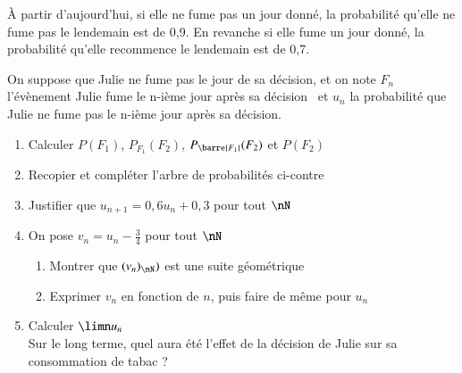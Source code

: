 \documentclass[oneside,12pt]{article}          %
\begin{document}
À partir d'aujourd'hui, si elle ne fume pas un jour donné, la probabilité qu'elle ne fume pas le lendemain est de 0,9. En revanche si elle fume un jour donné, la probabilité qu'elle recommence le lendemain est de 0,7.

On suppose que Julie ne fume pas le jour de sa décision, et on note $F_n$ l'évènement \og Julie fume le n-ième jour après sa décision \fg ~et $u_n$ la probabilité que Julie ne fume pas le n-ième jour après sa décision.


\begin{minipage}{0.6\textwidth}
\begin{enumerate}
    \item Calculer $P(F_1)$, $P_{F_1}(F_2)$, $P_{\barre{F_1}}(F_2)$ et $P(F_2)$
    \item Recopier et compléter l'arbre de probabilités ci-contre
    \item Justifier que $u_{n+1}=0,6u_n+0,3$ pour tout $\nN$
    \item On pose $v_n=u_n-\frac{3}{4}$ pour tout $\nN$
    \begin{enumerate}
        \item Montrer que $(v_n)_{\nN})$ est une suite géométrique
        \item Exprimer $v_n$ en fonction de $n$, puis faire de même pour $u_n$
    \end{enumerate}
    \item Calculer $\limn u_n$ \\
    Sur le long terme, quel aura été l'effet de la décision de Julie sur sa consommation de tabac ?
\end{enumerate}
\end{minipage}
\begin{minipage}{0.39\textwidth}
\end{minipage}
\end{document}
